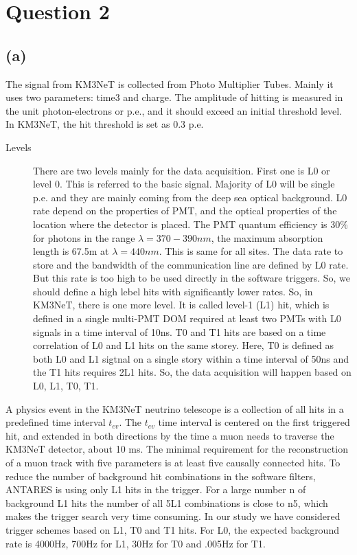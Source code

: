 \documentclass[a4paper,12pt]{article}
\begin{document}
\section*{Question 2}
\label{sec:org01daee2}
\subsection*{(a)}
\label{sec:orgb1395c1}
The signal from KM3NeT is collected from Photo Multiplier Tubes. Mainly it uses two parameters: time3 and charge. The amplitude of hitting is measured in the unit photon-electrons or p.e., and it should exceed an initial threshold level. In KM3NeT, the hit threshold is set as 0.3 p.e.

\begin{description}
\item[{Levels}] There are two levels mainly for the data acquisition. First one is L0 or level 0. This is referred to the basic signal. Majority of L0 will be single p.e. and they are mainly coming from the deep sea optical background. L0 rate depend on the properties of PMT, and the optical properties of the location where the detector is placed. The PMT quantum efficiency is 30\% for photons in the range \(\lambda = 370-390 nm\), the maximum absorption length is 67.5m at \(\lambda=440nm\). This is same for all sites. The data rate to store and the bandwidth of the communication line are defined by L0 rate. But this rate is too high to be used directly in the software triggers. So, we should define a high lebel hits with significantly lower rates. So, in KM3NeT, there is one more level. It is called level-1 (L1) hit, which is defined in a single multi-PMT DOM required at least two PMTs with L0 signals in a time interval of 10ns. T0 and T1 hits are based on a time correlation of L0 and L1 hits on the same storey. Here, T0 is defined as both L0 and L1 sigtnal on a single story within a time interval of 50ns and the T1 hits requires 2L1 hits. So, the data acquisition will happen based on L0, L1, T0, T1.
\end{description}

A physics event in the KM3NeT neutrino telescope is a collection of all hits in a predeﬁned time interval \(t_{ev}\). The \(t_{ev}\) time interval is centered on the ﬁrst triggered hit, and extended in both
directions by the time a muon needs to traverse the KM3NeT detector, about 10 ms. The minimal requirement for the reconstruction of a muon track with ﬁve parameters is at least ﬁve causally connected hits. To reduce the number of background hit combinations in the software ﬁlters, ANTARES is using only L1 hits in the trigger. For a large number n of background L1 hits the
number of all 5L1 combinations is close to n5, which makes the trigger search very time consuming. In our study we have considered trigger schemes based on L1, T0 and T1 hits.
For L0, the expected background rate is 4000Hz, 700Hz for L1, 30Hz for T0 and .005Hz for T1.\cite{2013} 
\end{document}
